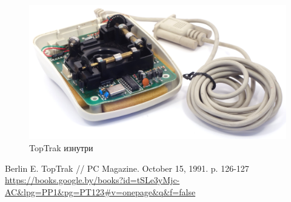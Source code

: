 \documentclass[11pt, a4paper]{article}
\begin{document}
\begin{figure}[h]
    \centering
    \includegraphics[scale=0.7]{1990_kraft_toptrack/inside_60.jpg}
    \caption{TopTrak изнутри}
    \label{fig:TopTrakInside}
\end{figure}

\begin{thebibliography}{9}
 Berlin E. TopTrak // PC Magazine. October 15, 1991. p. 126-127 \url{https://books.google.by/books?id=tSLe3yMjc-AC&lpg=PP1&pg=PT123#v=onepage&q&f=false}
\end{thebibliography}
\end{document}
